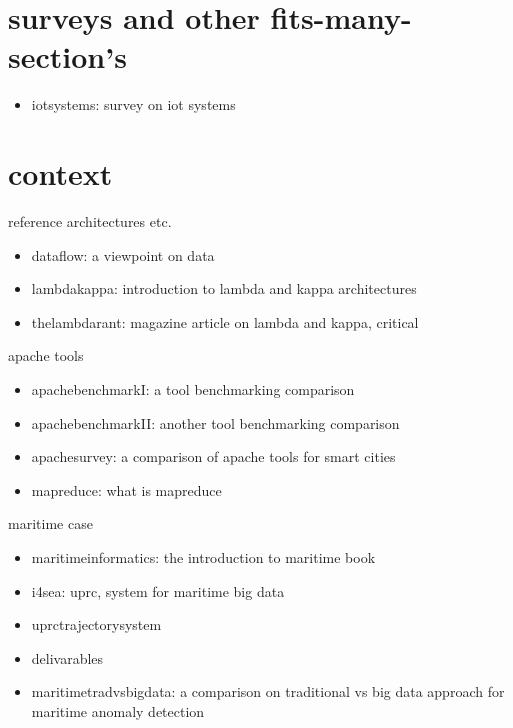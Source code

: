 \documentclass{article}
\begin{document}


\chapter{surveys and other fits-many-section's}

\begin{itemize}
    \item \cite{iotsystems} iotsystems: survey on iot systems
\end{itemize}

\chapter{context}

reference architectures etc.

\begin{itemize}
    \item \cite{dataflow} dataflow: a viewpoint on data
    \item \cite{lambdakappa} lambdakappa: introduction to lambda and kappa architectures
    \item \cite{thelambdarant} thelambdarant: magazine article on lambda and kappa, critical
\end{itemize}

apache tools

\begin{itemize}
    \item \cite{apachebenchmarkI} apachebenchmarkI: a tool benchmarking comparison
    \item \cite{apachebenchmarkII} apachebenchmarkII: another tool benchmarking comparison
    \item \cite{apachesurvey} apachesurvey: a comparison of apache tools for smart cities
    \item \cite{mapreduce} mapreduce: what is mapreduce
\end{itemize}

maritime case

\begin{itemize}
    \item \cite{maritimeinformatics} maritimeinformatics: the introduction to maritime book
     \item \cite{i4sea} i4sea: uprc, system for maritime big data
     \item \cite{uprctrajectorysystem} uprctrajectorysystem
     \item \cite{D1.1} \cite{D4.1} delivarables
     \item \cite{maritimetradvsbigdata} maritimetradvsbigdata: a comparison on traditional vs big data approach for maritime anomaly detection
\end{itemize}
\end{document}
